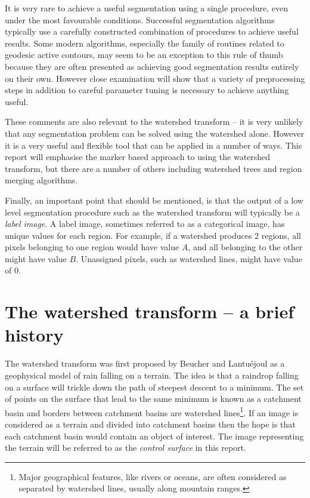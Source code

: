 \documentclass{InsightArticle}
\begin{document}
It is very rare to achieve a useful segmentation using a single
procedure, even under the most favourable conditions. Successful
segmentation algorithms typically use a carefully constructed
combination of procedures to achieve useful results. Some modern
algorithms, especially the family of routines related to geodesic
active contours, may seem to be an exception to this rule of thumb
because they are often presented as achieving good segmentation
results entirely on their own. However close examination will show
that a variety of preprocessing steps in addition to careful parameter
tuning is necessary to achieve anything useful.

These comments are also relevant to the watershed transform -- it is
very unlikely that any segmentation problem can be solved using the
watershed alone. However it is a very useful and flexible tool that
can be applied in a number of ways. This report will emphasise the
marker based approach to using the watershed transform, but there are
a number of others including watershed trees and region merging
algorithms.

Finally, an important point that should be mentioned, is that the
output of a low level segmentation procedure such as the watershed
transform will typically be a {\em label image}. A label image,
sometimes referred to as a categorical image, has unique values for
each region. For example, if a watershed produces 2 regions, all
pixels belonging to one region would have value $A$, and all belonging
to the other might have value $B$. Unassigned pixels, such as
watershed lines, might have value of $0$.

\section{The watershed transform -- a brief history}
\label{sect:history}
The watershed transform was first proposed by Beucher and
Lantu\'{e}joul\cite{Beucher-Lantu-79} as a geophysical model of rain
falling on a terrain. The idea is that a raindrop falling on a surface
will trickle down the path of steepest descent to a minimum. The set of
points on the surface that lead to the same minimum is known as a
catchment basin and borders between catchment basins are watershed
lines\footnote{Major geographical features, like rivers or oceans, are
often considered as separated by watershed lines, usually along
mountain ranges.}. If an image is considered as a terrain and divided
into catchment basins then the hope is that each catchment basin would
contain an object of interest. The image representing the terrain will
be referred to as the {\em control surface} in this report.
\end{document}
